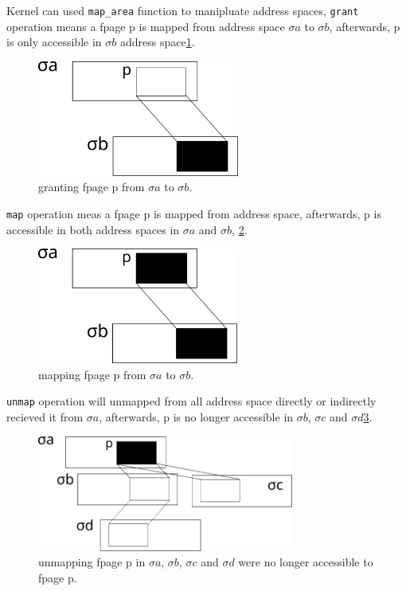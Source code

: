 \documentclass[10pt,preprint,nocopyrightspace]{sigplanconf}
\begin{document}
Kernel can used \verb|map_area| function to manipluate address spaces, \verb|grant| operation means a fpage p is mapped from address space $\sigma{a}$ to $\sigma{b}$, afterwards, p is only accessible in $\sigma{b}$ address space\ref{fig:grant}.

\begin{figure}[H]
	\begin{center}
		\includegraphics[height=1.5in]{picture/grant.png}
	\end{center}
	\caption{granting fpage p from $\sigma{a}$ to $\sigma{b}$.}
	\label{fig:grant}
\end{figure}


\verb|map| operation meas a fpage p is mapped from address space, afterwards, p is accessible in both address spaces in $\sigma{a}$ and $\sigma{b}$, \ref{fig:map}.

\begin{figure}[H]
	\begin{center}
		\includegraphics[height=1.5in]{picture/map.png}
	\end{center}
	\caption{mapping fpage p from $\sigma{a}$ to $\sigma{b}$.}
	\label{fig:map}
\end{figure}


\verb|unmap| operation will unmapped from all address space directly or indirectly recieved it from $\sigma{a}$, afterwards, p is no longer accessible in $\sigma{b}$, $\sigma{c}$ and $\sigma{d}$\ref{fig:unmap}.

\begin{figure}[H]
	\begin{center}
		\includegraphics[height=1.5in]{picture/unmap.png}
	\end{center}
	\caption{unmapping fpage p in $\sigma{a}$, $\sigma{b}$, $\sigma{c}$ and $\sigma{d}$ were no longer accessible to fpage p.}
	\label{fig:unmap}
\end{figure}
\end{document}
